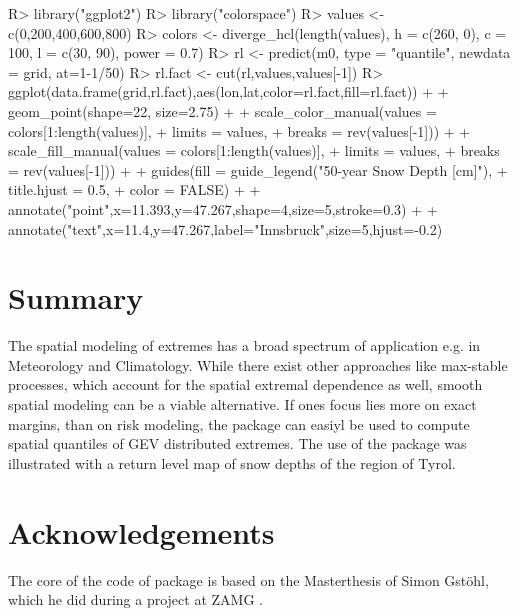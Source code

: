 \documentclass[a4paper,nojss]{jss}
\begin{document}
%
\begin{Schunk}
\begin{Sinput}
R> library("ggplot2")
R> library("colorspace")
R> values <- c(0,200,400,600,800)
R> colors <- diverge_hcl(length(values), h = c(260, 0), c = 100, l = c(30, 90), power = 0.7)
R> rl <- predict(m0, type = "quantile", newdata = grid, at=1-1/50)
R> rl.fact <- cut(rl,values,values[-1])
R> ggplot(data.frame(grid,rl.fact),aes(lon,lat,color=rl.fact,fill=rl.fact)) +
+    geom_point(shape=22, size=2.75) +
+    scale_color_manual(values = colors[1:length(values)],
+                       limits = values,
+                       breaks = rev(values[-1])) +
+    scale_fill_manual(values = colors[1:length(values)],
+                      limits = values,
+                      breaks = rev(values[-1])) +
+    guides(fill = guide_legend("50-year Snow Depth [cm]"),
+           title.hjust = 0.5,
+           color = FALSE) +
+    annotate("point",x=11.393,y=47.267,shape=4,size=5,stroke=0.3) +
+    annotate("text",x=11.4,y=47.267,label="Innsbruck",size=5,hjust=-0.2)
\end{Sinput}
\end{Schunk}
%



\section{Summary}
\label{sec:summary}

The spatial modeling of extremes has a broad spectrum of application e.g. in Meteorology and Climatology. While there exist other approaches like max-stable processes, which account for the spatial extremal dependence as well, smooth spatial modeling can be a viable alternative. If ones focus lies more on exact margins, than on risk modeling, the package  can easiyl be used to compute spatial quantiles of GEV distributed extremes. The use of the package was illustrated with a return level map of snow depths of the region of Tyrol.

\section{Acknowledgements}
\label{sec:ack}
The core of the code of package  is based on the Masterthesis of Simon Gst\"ohl, which he did during a project at ZAMG \citep{Gstohl2017}. 



\end{document}
